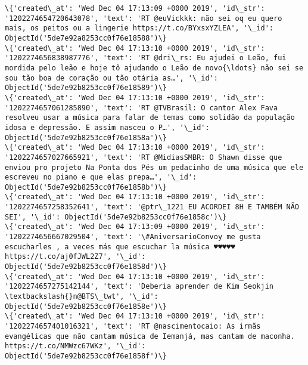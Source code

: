 \documentclass[11pt]{article}
\begin{document}
\begin{Verbatim}[commandchars=\\\{\}]
\{'created\_at': 'Wed Dec 04 17:13:09 +0000 2019', 'id\_str': '1202274654720643078', 'text': 'RT @euVickkk: não sei oq eu quero mais, os peitos ou a lingerie https://t.co/BYxsxYZLEA', '\_id': ObjectId('5de7e92a8253cc0f76e18588')\}
\{'created\_at': 'Wed Dec 04 17:13:10 +0000 2019', 'id\_str': '1202274656838987776', 'text': 'RT @dri\_rs: Eu ajudei o Leão, fui mordida pelo leão e hoje tô ajudando o Leão de novo{\ldots} não sei se sou tão boa de coração ou tão otária as…', '\_id': ObjectId('5de7e92b8253cc0f76e18589')\}
\{'created\_at': 'Wed Dec 04 17:13:10 +0000 2019', 'id\_str': '1202274657061285890', 'text': 'RT @TVBrasil: O cantor Alex Fava resolveu usar a música para falar de temas como solidão da população idosa e depressão. E assim nasceu o P…', '\_id': ObjectId('5de7e92b8253cc0f76e1858a')\}
\{'created\_at': 'Wed Dec 04 17:13:10 +0000 2019', 'id\_str': '1202274657027665921', 'text': 'RT @MidiasSMBR: O Shawn disse que enviou pro projeto Na Ponta dos Pés um pedacinho de uma música que ele escreveu no piano e que elas prepa…', '\_id': ObjectId('5de7e92b8253cc0f76e1858b')\}
\{'created\_at': 'Wed Dec 04 17:13:10 +0000 2019', 'id\_str': '1202274657258352641', 'text': '@ptr\_1221 EU ACORDEI 8H E TAMBÉM NÃO SEI', '\_id': ObjectId('5de7e92b8253cc0f76e1858c')\}
\{'created\_at': 'Wed Dec 04 17:13:09 +0000 2019', 'id\_str': '1202274656667029504', 'text': '\#AniversarioConvoy me gusta escucharles , a veces más que escuchar la música ♥️♥️♥️♥️♥️ https://t.co/aj0fJWL2Z7', '\_id': ObjectId('5de7e92b8253cc0f76e1858d')\}
\{'created\_at': 'Wed Dec 04 17:13:10 +0000 2019', 'id\_str': '1202274657275142144', 'text': 'Deberia aprender de Kim Seokjin \textbackslash{}n@BTS\_twt', '\_id': ObjectId('5de7e92b8253cc0f76e1858e')\}
\{'created\_at': 'Wed Dec 04 17:13:10 +0000 2019', 'id\_str': '1202274657401016321', 'text': 'RT @nascimentocaio: As irmãs evangélicas que não cantam música de Iemanjá, mas cantam de maconha. https://t.co/NMWzc67WKz', '\_id': ObjectId('5de7e92b8253cc0f76e1858f')\}

    \end{Verbatim}
\end{document}
